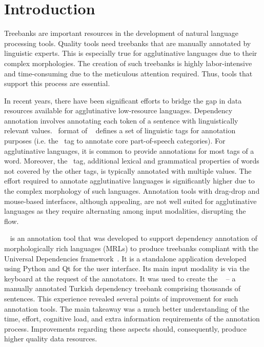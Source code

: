 \section{Introduction}
\label{sec:introduction}

Treebanks are important resources in the development of natural language processing tools.
Quality tools need treebanks that are manually annotated by linguistic experts.
This is especially true for agglutinative languages due to their complex morphologies.
The creation of such treebanks is highly labor-intensive and time-consuming due to the meticulous attention required.
Thus, tools that support this process are essential.

In recent years, there have been significant efforts to bridge the gap in data resources available for agglutinative low-resource languages.
Dependency annotation involves annotating each token of a sentence with linguistically relevant values.
\conllu\ format of \ud~\cite{UD} defines a set of linguistic tags for annotation purposes (i.e. the \upos\ tag to annotate core part-of-speech categories).
For agglutinative languages, it is common to provide annotations for most tags of a word. Moreover, the \feats\ tag, additional lexical and grammatical properties of words not covered by the other tags, is typically annotated with multiple values.
The effort required to annotate agglutinative languages is significantly higher due to the complex morphology of such languages.
Annotation tools with drag-drop and mouse-based interfaces, although appealing, are not well suited for agglutinative languages as they require alternating among input modalities, disrupting the flow.

\boatvone~\cite{turk2021resources} is an annotation tool that was developed to support dependency annotation of morphologically rich languages (MRLs) to produce treebanks compliant with the Universal Dependencies framework~\cite{UD}.
It is a standalone application developed using Python and Qt for the user interface.
Its main input modality is via the keyboard at the request of the annotators.
It was used to create the \bountreebank~\cite{turk-etal-2019-turkish,turk2021resources,UD-Boun-Treebank} -- a manually annotated Turkish dependency treebank comprising thousands of sentences.
This experience revealed several points of improvement for such annotation tools.
The main takeaway was a much better understanding of the time, effort, cognitive load, and extra information requirements of the annotation process.
Improvements regarding these aspects should, consequently, produce higher quality data resources.

